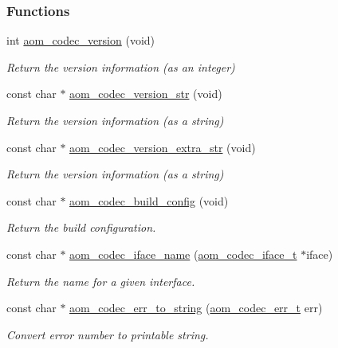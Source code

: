\subsubsection*{Functions}
\begin{DoxyCompactItemize}
\item 
int \hyperlink{group__codec_gaaed56af63c70186d571ab44c72500e77}{aom\+\_\+codec\+\_\+version} (void)
\begin{DoxyCompactList}\small\item\em Return the version information (as an integer) \end{DoxyCompactList}\item 
const char $\ast$ \hyperlink{group__codec_ga62d45353664dd1e1cb0868d6fdb77552}{aom\+\_\+codec\+\_\+version\+\_\+str} (void)
\begin{DoxyCompactList}\small\item\em Return the version information (as a string) \end{DoxyCompactList}\item 
const char $\ast$ \hyperlink{group__codec_gadde8130d243e6228f6bfedc98f2e3532}{aom\+\_\+codec\+\_\+version\+\_\+extra\+\_\+str} (void)
\begin{DoxyCompactList}\small\item\em Return the version information (as a string) \end{DoxyCompactList}\item 
const char $\ast$ \hyperlink{group__codec_gaf72432504daf378befd8b3c122f14c01}{aom\+\_\+codec\+\_\+build\+\_\+config} (void)
\begin{DoxyCompactList}\small\item\em Return the build configuration. \end{DoxyCompactList}\item 
const char $\ast$ \hyperlink{group__codec_ga013b1f6d96b2cf9489396311a7e5179b}{aom\+\_\+codec\+\_\+iface\+\_\+name} (\hyperlink{group__codec_ga4ef55b44c762836d1550e11921bed403}{aom\+\_\+codec\+\_\+iface\+\_\+t} $\ast$iface)
\begin{DoxyCompactList}\small\item\em Return the name for a given interface. \end{DoxyCompactList}\item 
const char $\ast$ \hyperlink{group__codec_ga83c6525528574d1a88e73a9f605c9115}{aom\+\_\+codec\+\_\+err\+\_\+to\+\_\+string} (\hyperlink{group__codec_gaaae61e0f8663e6137f1e228757248e7c}{aom\+\_\+codec\+\_\+err\+\_\+t} err)
\begin{DoxyCompactList}\small\item\em Convert error number to printable string. \end{DoxyCompactList}\item 

\end{DoxyCompactItemize}
